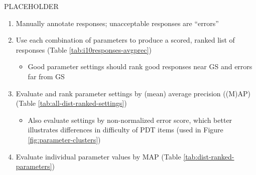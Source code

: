 \documentclass[final,t]{beamer}
\begin{document}
\begin{frame}{}
\begin{columns}[t]
\begin{column}{.64\linewidth}
\begin{columns}
\begin{column}{.49\linewidth}
\vspace{-1em}
\begin{block}{PLACEHOLDER}
\begin{center}
\begin{minipage}{.9\textwidth}
\begin{enumerate}
	\item{Manually annotate responses; unacceptable responses are ``errors''}
	\item{Use each combination of parameters to produce a scored, ranked list of responses (Table \ref{tab:i10responses-avgprec})}
	\begin{itemize}
		\item{Good parameter settings should rank good responses near GS and errors far from GS}
	\end{itemize}
	\item{Evaluate and rank parameter settings by (mean) average precision ((M)AP) (Table \ref{tab:all-dist-ranked-settings})}
	\begin{itemize}
		\item{Also evaluate settings by non-normalized error score, which better illustrates differences in difficulty of PDT items (used in Figure \ref{fig:parameter-clusters})}
	\end{itemize}
	\item{Evaluate individual parameter values by MAP (Table \ref{tab:dist-ranked-parameters})}
\end{enumerate}
\end{minipage}
\end{center}
\vspace{.8em}


\end{block}
\end{column}
\end{columns}
\end{column}
\end{columns}
\end{frame}
\end{document}
